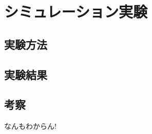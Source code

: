\documentclass[../main]{subfiles}
\begin{document}
\newpage
\chapter{シミュレーション実験}
\label{chap:simulation}

\section{実験方法}
\section{実験結果}
\section{考察}
なんもわからん!
\end{document}
